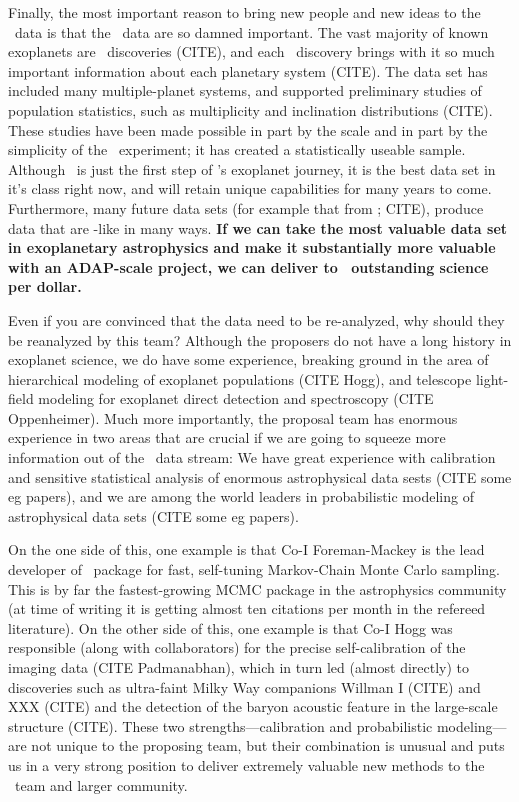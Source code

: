 \documentclass[letterpaper,12pt,preprint]{hack_aastex}
\newcommand{\emcee}{\package{emcee}}
\begin{document}
Finally, the most important reason to bring new people and new ideas
to the \Kepler\ data is that the \Kepler\ data are so damned
important.  The vast majority of known exoplanets are
\Kepler\ discoveries (CITE), and each \Kepler\ discovery brings with
it so much important information about each planetary system (CITE).
The data set has included many multiple-planet systems, and supported
preliminary studies of population statistics, such as multiplicity and
inclination distributions (CITE).  These studies have been made
possible in part by the scale and in part by the simplicity of the
\Kepler\ experiment; it has created a statistically useable sample.
Although \Kepler\ is just the first step of \NASA's exoplanet journey,
it is the best data set in it's class right now, and will retain
unique capabilities for many years to come.  Furthermore, many future
data sets (for example that from \TESS; CITE), produce data that are
\Kepler-like in many ways.  \textbf{If we can take the most valuable
  data set in exoplanetary astrophysics and make it substantially more
  valuable with an ADAP-scale project, we can deliver to
  \NASA\ outstanding science per dollar.}

Even if you are convinced that the data need to be re-analyzed, why
should they be reanalyzed by this team?  Although the proposers do not
have a long history in exoplanet science, we do have some experience,
breaking ground in the area of hierarchical modeling of exoplanet
populations (CITE Hogg), and telescope light-field modeling for
exoplanet direct detection and spectroscopy (CITE Oppenheimer).  Much
more importantly, the proposal team has enormous experience in two
areas that are crucial if we are going to squeeze more information out
of the \Kepler\ data stream: We have great experience with calibration
and sensitive statistical analysis of enormous astrophysical data
sests (CITE some eg papers), and we are among the world leaders in
probabilistic modeling of astrophysical data sets (CITE some eg
papers).

On the one side of this,
one example is that Co-I Foreman-Mackey is the lead developer of \emcee\ package
for fast, self-tuning Markov-Chain Monte Carlo sampling.
This is by far the fastest-growing MCMC package in the astrophysics community (at time of writing it is getting almost ten citations per month in the refereed literature).
On the other side of this,
one example is that Co-I Hogg was responsible (along with collaborators) for the
precise self-calibration of the 
imaging data (CITE Padmanabhan), which in turn led (almost directly)
to discoveries such as ultra-faint Milky Way companions Willman I
(CITE) and XXX (CITE) and the detection of the baryon acoustic feature
in the large-scale structure (CITE).  These two
strengths---calibration and probabilistic modeling---are not unique to
the proposing team, but their combination is unusual and puts us in a
very strong position to deliver extremely valuable new methods to the
\Kepler\ team and larger community.
\end{document}
